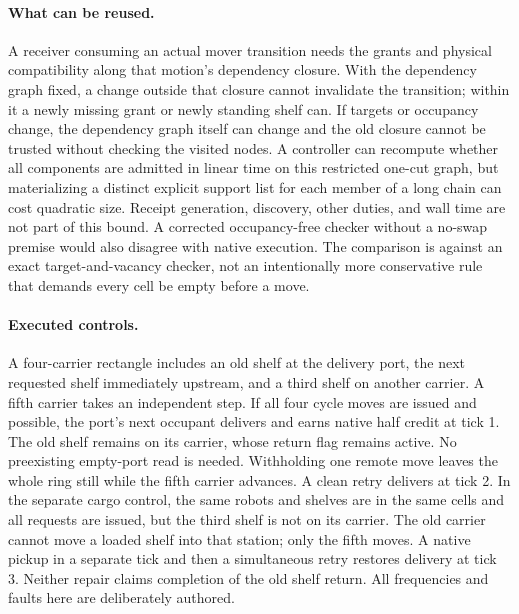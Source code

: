 \documentclass[11pt]{article}
\begin{document}
\paragraph{What can be reused.}
A receiver consuming an actual mover transition needs the grants and physical compatibility along that motion's dependency closure. With the dependency graph fixed, a change outside that closure cannot invalidate the transition; within it a newly missing grant or newly standing shelf can. If targets or occupancy change, the dependency graph itself can change and the old closure cannot be trusted without checking the visited nodes. A controller can recompute whether all components are admitted in linear time on this restricted one-cut graph, but materializing a distinct explicit support list for each member of a long chain can cost quadratic size. Receipt generation, discovery, other duties, and wall time are not part of this bound. A corrected occupancy-free checker without a no-swap premise would also disagree with native execution. The comparison is against an exact target-and-vacancy checker, not an intentionally more conservative rule that demands every cell be empty before a move.

\paragraph{Executed controls.}
A four-carrier rectangle includes an old shelf at the delivery port, the next requested shelf immediately upstream, and a third shelf on another carrier. A fifth carrier takes an independent step. If all four cycle moves are issued and possible, the port's next occupant delivers and earns native half credit at tick 1. The old shelf remains on its carrier, whose return flag remains active. No preexisting empty-port read is needed. Withholding one remote move leaves the whole ring still while the fifth carrier advances. A clean retry delivers at tick 2. In the separate cargo control, the same robots and shelves are in the same cells and all requests are issued, but the third shelf is not on its carrier. The old carrier cannot move a loaded shelf into that station; only the fifth moves. A native pickup in a separate tick and then a simultaneous retry restores delivery at tick 3. Neither repair claims completion of the old shelf return. All frequencies and faults here are deliberately authored.
\end{document}
